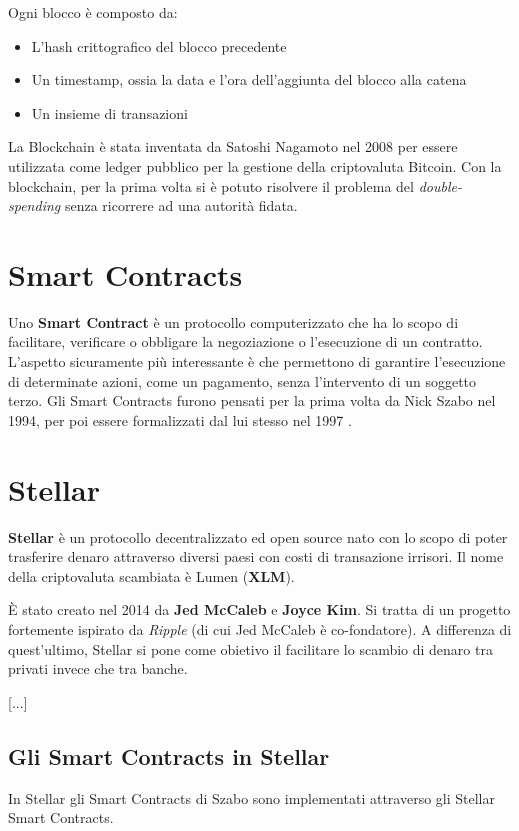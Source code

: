 Ogni blocco è composto da:
\begin{itemize}
	\item L'hash crittografico del blocco precedente
	\item Un timestamp, ossia la data e l'ora dell'aggiunta del blocco alla catena
	\item Un insieme di transazioni
\end{itemize}
La Blockchain è stata inventata da Satoshi Nagamoto nel 2008 per essere utilizzata
come ledger pubblico per la gestione della criptovaluta Bitcoin. Con la blockchain,
per la prima volta si è potuto risolvere il problema del \textit{double-spending}
senza ricorrere ad una autorità fidata.


\section{Smart Contracts}
Uno \textbf{Smart Contract} è un protocollo computerizzato che ha lo scopo di
facilitare, verificare o obbligare la negoziazione o l'esecuzione di un contratto.
L'aspetto sicuramente più interessante è che permettono di garantire l'esecuzione
di determinate azioni, come un pagamento, senza l'intervento di un soggetto terzo.
Gli Smart Contracts furono pensati per la prima volta da Nick Szabo nel 1994, per poi
essere formalizzati dal lui stesso nel 1997 \cite{szabo-smart-contracts}.

\section{Stellar}

\textbf{Stellar} è un protocollo decentralizzato ed
open source nato con lo scopo di poter
trasferire denaro attraverso diversi
paesi con costi di transazione irrisori. Il nome della criptovaluta scambiata
è Lumen (\textbf{XLM}).

È stato creato nel 2014 da \textbf{Jed McCaleb} e \textbf{Joyce Kim}.
Si tratta di un progetto fortemente ispirato da \textit{Ripple} (di cui Jed McCaleb
è co-fondatore). A differenza di quest'ultimo, Stellar si pone come obietivo
il facilitare lo scambio di denaro tra privati invece che tra banche.

[...]


\subsection{Gli Smart Contracts in Stellar}
\label{subsec:stellar smart contracts}
In Stellar gli Smart Contracts di Szabo sono implementati
attraverso gli Stellar Smart Contracts.

